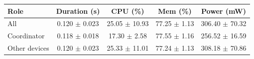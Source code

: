 \begin{tabular}{lcccc}
\hline
\textbf{Role} & \textbf{Duration (s)} & \textbf{CPU (\%)} & \textbf{Mem (\%)} & \textbf{Power (mW)} \\
\hline
All & 0.120 $\pm$ 0.023 & 25.05 $\pm$ 10.93 & 77.25 $\pm$ 1.13 & 306.40 $\pm$ 70.32 \\
Coordinator & 0.118 $\pm$ 0.018 & 17.30 $\pm$ 2.58 & 77.55 $\pm$ 1.16 & 256.52 $\pm$ 16.59 \\
Other devices & 0.120 $\pm$ 0.023 & 25.33 $\pm$ 11.01 & 77.24 $\pm$ 1.13 & 308.18 $\pm$ 70.86 \\
\hline
\end{tabular}
